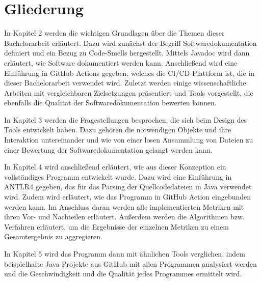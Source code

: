 \section{Gliederung}
In Kapitel 2 werden die wichtigen Grundlagen über die Themen dieser Bachelorarbeit erläutert. Dazu  wird zunächst der Begriff Softwaredokumentation definiert und ein Bezug zu Code-Smells hergestellt. Mittels Javadoc wird dann erläutert, wie Software dokumentiert werden kann. Anschließend wird eine Einführung in GitHub Actions gegeben, welches die CI/CD-Plattform ist, die in dieser Bachelorarbeit verwendet wird. Zuletzt werden einige wissenschaftliche Arbeiten mit vergleichbaren Zielsetzungen präsentiert und Tools vorgestellt, die ebenfalls die Qualität der Softwaredokumentation bewerten können.

In Kapitel 3 werden die Fragestellungen besprochen, die sich beim Design des Tools entwickelt haben. Dazu gehören die notwendigen Objekte und ihre Interaktion untereinander und wie von einer losen Ansammlung von Dateien zu einer Bewertung der Softwaredokumentation gelangt werden kann.

In Kapitel 4 wird anschließend erläutert, wie aus dieser Konzeption ein vollständiges Programm entwickelt wurde. Dazu wird eine Einführung in ANTLR4 gegeben, das für das Parsing der Quellcodedateien in Java verwendet wird. Zudem wird erläutert, wie das Programm in GitHub Action eingebunden werden kann. Im Anschluss daran werden alle implementierten Metriken mit ihren Vor- und Nachteilen erläutert. Außerdem werden die Algorithmen bzw. Verfahren erläutert, um die Ergebnisse der einzelnen Metriken zu einem Gesamtergebnis zu aggregieren. 

In Kapitel 5 wird das Programm dann mit ähnlichen Tools verglichen, indem beispielhafte Java-Projekte aus GitHub mit allen Programmen analysiert werden und die Geschwindigkeit und die Qualität jedes Programmes ermittelt wird. 








